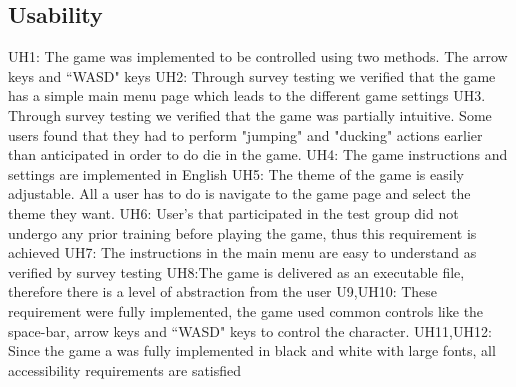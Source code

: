 \documentclass[12pt, titlepage]{article}
\begin{document}
	\subsection{Usability}
	UH1: The game was implemented to be controlled using two methods. The arrow keys and ``WASD" keys
	UH2: Through survey testing we verified that the game has a simple main menu page which leads to the different game settings	UH3. Through survey testing we verified that the game was partially intuitive. Some users found that they had to perform "jumping" and "ducking" actions earlier than anticipated in order to do die in the game.
	UH4: The game instructions and settings are implemented in English
	UH5: The theme of the game is easily adjustable. All a user has to do is navigate to the game page and select the theme they want.
	UH6: User's that participated in the test group did not undergo any prior training before playing the game, thus this requirement is achieved
	UH7: The instructions in the main menu are easy to understand as verified by survey testing
	UH8:The game is delivered as an executable file, therefore there is a level of abstraction from the user
	U9,UH10: These requirement were fully implemented, the game used common controls like the space-bar, arrow keys and ``WASD" keys to control the character.
	UH11,UH12: Since the game a was fully implemented in black and white with large fonts, all accessibility requirements are satisfied
\end{document}

